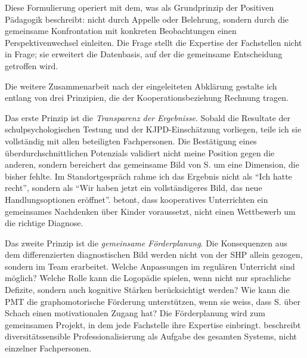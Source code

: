 \documentclass[ngerman, a4paper]{article}
\begin{document}
Diese Formulierung operiert mit dem, was \textcite{burow2021positive} als Grundprinzip der Positiven
Pädagogik beschreibt: nicht durch Appelle oder Belehrung, sondern durch die
gemeinsame Konfrontation mit konkreten Beobachtungen einen Perspektivenwechsel
einleiten. Die Frage stellt die Expertise der
Fachstellen nicht in Frage; sie erweitert die Datenbasis, auf der die
gemeinsame Entscheidung getroffen wird.

Die weitere Zusammenarbeit nach der eingeleiteten Abklärung gestalte ich
entlang von drei Prinzipien, die der Kooperationsbeziehung Rechnung tragen.

Das erste Prinzip ist die \textit{Transparenz der Ergebnisse}. Sobald die
Resultate der schulpsychologischen Testung und der KJPD-Einschätzung vorliegen,
teile ich sie vollständig mit allen beteiligten Fachpersonen. Die Bestätigung
eines überdurchschnittlichen Potenzials validiert nicht meine Position gegen
die anderen, sondern bereichert das gemeinsame Bild von S. um eine Dimension,
die bisher fehlte. Im Standortgespräch rahme ich das Ergebnis nicht als
\enquote{Ich hatte recht}, sondern als \enquote{Wir haben jetzt ein
vollständigeres Bild, das neue Handlungsoptionen eröffnet}.
\textcite[S.\,151--160]{kummerwyss2017kooperativunterrichten} betont, dass
kooperatives Unterrichten ein gemeinsames Nachdenken über Kinder
voraussetzt, nicht einen Wettbewerb um die richtige Diagnose.

Das zweite Prinzip ist die \textit{gemeinsame Förderplanung}. Die
Konsequenzen aus dem differenzierten diagnostischen Bild werden nicht von
der SHP allein gezogen, sondern im Team erarbeitet. Welche Anpassungen
im regulären Unterricht sind möglich? Welche Rolle kann die Logopädie
spielen, wenn nicht nur sprachliche Defizite, sondern auch kognitive
Stärken berücksichtigt werden? Wie kann die PMT die graphomotorische
Förderung unterstützen, wenn sie weiss, dass S. über Schach einen
motivationalen Zugang hat? Die Förderplanung wird zum gemeinsamen Projekt,
in dem jede Fachstelle ihre Expertise einbringt. \textcite[S.\,161,\,163\psq]{macha2019gender} beschreibt
diversitätssensible Professionalisierung als Aufgabe des gesamten Systems,
nicht einzelner Fachpersonen.
\end{document}
